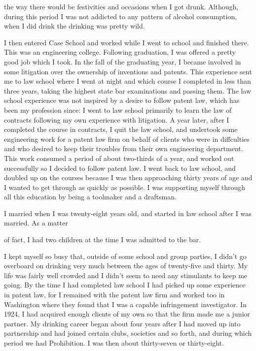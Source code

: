 \begin{biblechapter}
the way there would be festivities and occasions when I got drunk. Although, during this period I was not addicted to any pattern of alcohol consumption, when I did drink the drinking was pretty wild.

I then entered Case School and worked while I went to school and finished there. This was an engineering college. Following graduation, I was offered a pretty good job which I took. In the fall of the graduating year, I became involved in some litigation over the ownership of inventions and patents. This experience sent me to law school where I went at night and which course I completed in less than three years, taking the highest state bar examinations and passing them. The law school experience was not inspired by a desire to follow patent law, which has been my profession since: I went to law school primarily to learn the law of contracts following my own experience with litigation. A year later, after I completed the course in contracts, I quit the law school, and undertook some engineering work for a patent law firm on behalf of clients who were in diffculties and who desired to keep their troubles from their own engineering department. This work consumed a period of about two-thirds of a year, and worked out successfully so I decided to follow patent law. I went back to law school, and doubled up on the courses because I was then approaching thirty years of age and I wanted to get through as quickly as possible. I was supporting myself through all this education by being a toolmaker and a draftsman.

I married when I was twenty-eight years old, and started in law school after I was married. As a matter

of fact, I had two children at the time I was admitted to the bar.

I kept myself so busy that, outside of some school and group parties, I didn’t go overboard on drinking very much between the ages of twenty-five and thirty. My life was fairly well crowded and I didn’t seem to need any stimulants to keep me going. By the time I had completed law school I had picked up some experience in patent law, for I remained with the patent law firm and worked too in Washington where they found that I was a capable infringement investigator. In 1924, I had acquired enough clients of my own so that the firm made me a junior partner. My drinking career began about four years after I had moved up into partnership and had joined certain clubs, societies and so forth, and during which period we had Prohibition. I was then about thirty-seven or thirty-eight.


\end{biblechapter}
